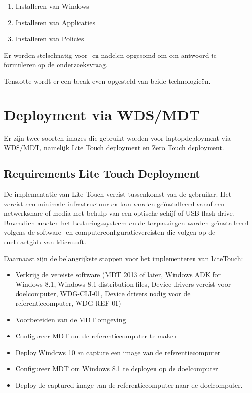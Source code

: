\begin{enumerate}
    \item Installeren van Windows
    \item Installeren van Applicaties
    \item Installeren van Policies
\end{enumerate}

Er worden stelselmatig voor- en nadelen opgesomd om een antwoord te formuleren op de onderzoeksvraag.

Tenslotte wordt er een break-even opgesteld van beide technologieën.

\section{Deployment via WDS/MDT}

Er zijn twee soorten images die gebruikt worden voor laptopdeployment via WDS/MDT, namelijk Lite Touch deployment en Zero Touch deployment.

\subsection{Requirements Lite Touch Deployment}
De implementatie van Lite Touch vereist tussenkomst van de gebruiker. Het vereist een minimale infrastructuur en kan worden geïnstalleerd vanaf een netwerkshare of media met behulp van een optische schijf of USB flash drive. Bovendien moeten het besturingssysteem en de toepassingen worden geïnstalleerd volgens de software- en computerconfiguratievereisten die volgen op de snelstartgids van Microsoft.

Daarnaast zijn de belangrijkste stappen voor het implementeren van LiteTouch:

\begin{itemize}
    \item Verkrijg de vereiste software
    (MDT 2013 of later, Windows ADK for Windows 8.1, Windows 8.1 distribution files, Device drivers vereist voor doelcomputer, WDG-CLI-01, Device drivers nodig voor de referentiecomputer, WDG-REF-01)
    \item Voorbereiden van de MDT omgeving
    \item Configureer MDT om de referentiecomputer te maken
    \item Deploy Windows 10 en capture een image van de referentiecomputer
    \item Configureer MDT om Windows 8.1 te deployen op de doelcomputer
    \item Deploy de captured image van de referentiecomputer naar de doelcomputer.
\end{itemize}

